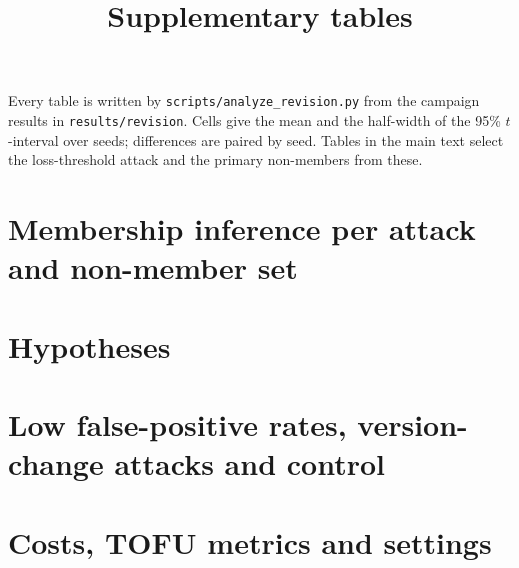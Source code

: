 \documentclass[10pt]{article}
\title{Supplementary tables}
\date{}
\begin{document}
\maketitle
Every table is written by \texttt{scripts/analyze\_revision.py} from the campaign results in
\texttt{results/revision}. Cells give the mean and the half-width of the 95\% $t$-interval over seeds;
differences are paired by seed. Tables in the main text select the loss-threshold attack and the
primary non-members from these.

\section{Membership inference per attack and non-member set}













\section{Hypotheses}






\section{Low false-positive rates, version-change attacks and control}




\section{Costs, TOFU metrics and settings}




\end{document}
